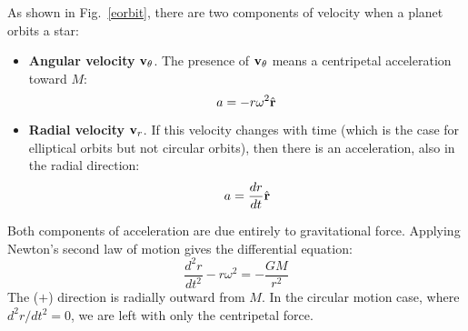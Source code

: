 \documentclass[11pt]{article}
\newcommand{\mb}[1]{
  \ensuremath\mathbf{#1}
}
\begin{document}
As shown in Fig.~\ref{eorbit}, there are two components of velocity when a
planet orbits a star:
\begin{itemize}
\item\textbf{Angular velocity} $\mb{v}_\theta$. The presence of $\mb{v}_\theta$
  means a centripetal acceleration toward $M$:
  \begin{equation}
    a=-r\omega^2\hat{\mb{r}}
  \end{equation}
\item\textbf{Radial velocity} $\mb{v}_r$. If this velocity changes with time
  (which is the case for elliptical orbits but not circular orbits), then there
  is an acceleration, also in the radial direction:
  \begin{equation}
    a=\frac{dr}{dt}\hat{\mb{r}}
  \end{equation}
\end{itemize}
Both components of acceleration are due entirely to gravitational force.
Applying Newton's second law of motion gives the differential equation:
\begin{equation}
  \frac{d^2r}{dt^2}-r\omega^2=-\frac{GM}{r^2}
  \label{ode1}
\end{equation}
The ($+$) direction is radially outward from $M$. In the circular motion case,
where $d^2r/dt^2=0$, we are left with only the centripetal force.
\end{document}
